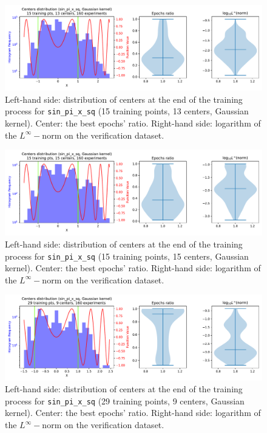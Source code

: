 \documentclass[12pt]{report} %
\begin{document}
\begin{figure}[ht]
  \centering
  \includegraphics[width=\textwidth]
  {imagenes/experiments/1d/sin_pi_x_sq_statistic_interpolation/tr15_c13_sin_pi_x_sq_gaussian_kernel.pdf}
  \caption{Left-hand side: distribution of centers at the end of the training process for
    \texttt{sin\_pi\_x\_sq} (15 training points, 13 centers, Gaussian kernel). Center: the best epochs' ratio.
    Right-hand side: logarithm of the $L^\infty-$norm on the verification dataset.}
  \label{fig:sin-pi-x-sq-statistic-tr15-c13}
\end{figure}

\begin{figure}[ht]
  \centering
  \includegraphics[width=\textwidth]
  {imagenes/experiments/1d/sin_pi_x_sq_statistic_interpolation/tr15_c15_sin_pi_x_sq_gaussian_kernel.pdf}
  \caption{Left-hand side: distribution of centers at the end of the training process for
    \texttt{sin\_pi\_x\_sq} (15 training points, 15 centers, Gaussian kernel). Center: the best epochs' ratio.
    Right-hand side: logarithm of the $L^\infty-$norm on the verification dataset.}
  \label{fig:sin-pi-x-sq-statistic-tr15-c15}
\end{figure}

\begin{figure}[ht]
  \centering
  \includegraphics[width=\textwidth]
  {imagenes/experiments/1d/sin_pi_x_sq_statistic_interpolation/tr29_c9_sin_pi_x_sq_gaussian_kernel.pdf}
  \caption{Left-hand side: distribution of centers at the end of the training process for
    \texttt{sin\_pi\_x\_sq} (29 training points, 9 centers, Gaussian kernel). Center: the best epochs' ratio.
    Right-hand side: logarithm of the $L^\infty-$norm on the verification dataset.}
  \label{fig:sin-pi-x-sq-statistic-tr29-c9}
\end{figure}
\end{document}
